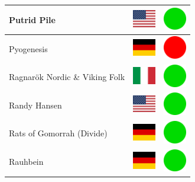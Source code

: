 \documentclass[12pt, a4paper, twoside]{report}
\begin{document}
\begin{center}
\begin{longtable}{|p{5cm}|p{2cm}|p{2cm}|}
Putrid Pile & \includegraphics[width=1cm]{4x3/us} & \includegraphics[width=1cm]{likes/y} \\ \hline
Pyogenesis & \includegraphics[width=1cm]{4x3/de} & \includegraphics[width=1cm]{likes/n} \\ \hline
Ragnarök Nordic \& Viking Folk & \includegraphics[width=1cm]{4x3/it} & \includegraphics[width=1cm]{likes/y} \\ \hline
Randy Hansen & \includegraphics[width=1cm]{4x3/us} & \includegraphics[width=1cm]{likes/y} \\ \hline
Rats of Gomorrah (Divide) & \includegraphics[width=1cm]{4x3/de} & \includegraphics[width=1cm]{likes/y} \\ \hline
Rauhbein & \includegraphics[width=1cm]{4x3/de} & \includegraphics[width=1cm]{likes/y} \\ \hline

\end{longtable}
\end{center}
\end{document}
